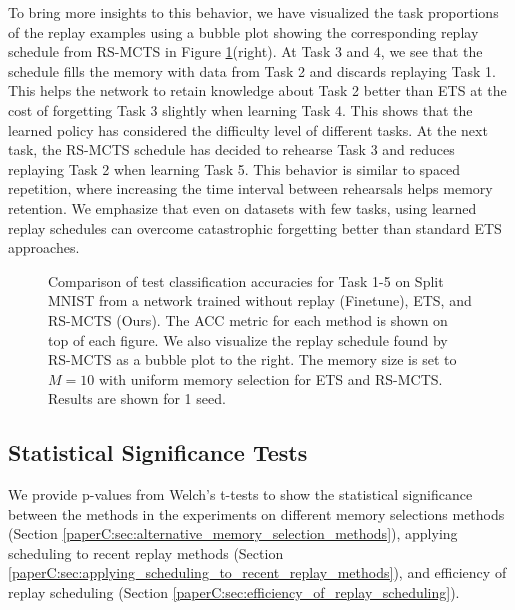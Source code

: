 To bring more insights to this behavior, we have visualized the task proportions of the replay examples using a bubble plot showing the corresponding replay schedule from RS-MCTS in Figure \ref{fig:split_mnist_task_accuracies_and_bubble_plot}(right). At Task 3 and 4, we see that the schedule fills the memory with data from Task 2 and discards replaying Task 1. This helps the network to retain knowledge about Task 2 better than ETS at the cost of forgetting Task 3 slightly when learning Task 4. This shows that the learned policy has considered the difficulty level of different tasks. At the next task, the RS-MCTS schedule has decided to rehearse Task 3 and reduces replaying Task 2 when learning Task 5. This behavior is similar to spaced repetition, where increasing the time interval between rehearsals helps memory retention.
We emphasize that even on datasets with few tasks, using learned replay schedules can overcome catastrophic forgetting better than standard ETS approaches.



\begin{figure}[t]
  \centering
  \setlength{\figwidth}{0.27\textwidth}
  \setlength{\figheight}{.15\textheight}
  
  \vspace{-3mm}
  \caption{ Comparison of test classification accuracies for Task 1-5 on Split MNIST from a network trained without replay (Finetune), ETS, and RS-MCTS (Ours). The ACC metric for each method is shown on top of each figure. We also visualize the replay schedule found by RS-MCTS as a bubble plot to the right. The memory size is set to $M=10$ with uniform memory selection for ETS and RS-MCTS. Results are shown for 1 seed. 
  }
  \vspace{-3mm}
  \label{fig:split_mnist_task_accuracies_and_bubble_plot}
\end{figure}



\subsection{Statistical Significance Tests}\label{paperC:app:statistical_significance_tests}

We provide p-values from Welch's t-tests to show the statistical significance between the methods in the experiments on different memory selections methods (Section \ref{paperC:sec:alternative_memory_selection_methods}), applying scheduling to recent replay methods (Section \ref{paperC:sec:applying_scheduling_to_recent_replay_methods}), and efficiency of replay scheduling (Section \ref{paperC:sec:efficiency_of_replay_scheduling}).

